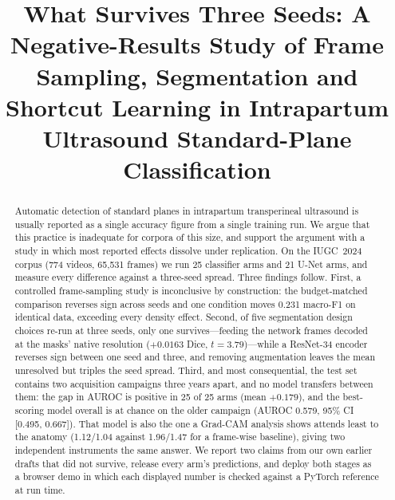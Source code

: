 \documentclass[conference]{IEEEtran}
\begin{document}
\title{What Survives Three Seeds: A Negative-Results Study of Frame Sampling,
Segmentation and Shortcut Learning in Intrapartum Ultrasound Standard-Plane
Classification}

\author{
}

\maketitle

\begin{abstract}
Automatic detection of standard planes in intrapartum transperineal ultrasound
is usually reported as a single accuracy figure from a single training run. We
argue that this practice is inadequate for corpora of this size, and support
the argument with a study in which most reported effects dissolve under
replication. On the IUGC~2024 corpus (774 videos, 65{,}531 frames) we run 25
classifier arms and 21 U-Net arms, and measure every difference against a
three-seed spread. Three findings follow. First, a controlled frame-sampling
study is inconclusive by construction: the budget-matched comparison reverses
sign across seeds and one condition moves 0.231 macro-F1 on identical data,
exceeding every density effect. Second, of five segmentation design choices
re-run at three seeds, only one survives---feeding the network frames decoded
at the masks' native resolution ($+0.0163$ Dice, $t=3.79$)---while a ResNet-34
encoder reverses sign between one seed and three, and removing augmentation
leaves the mean unresolved but triples the seed spread. Third, and most
consequential, the test set contains two acquisition campaigns three years
apart, and no model transfers between them: the gap in AUROC is positive in 25
of 25 arms (mean $+0.179$), and the best-scoring model overall is at chance on
the older campaign (AUROC 0.579, 95\% CI [0.495, 0.667]). That model is also
the one a Grad-CAM analysis shows attends least to the anatomy (1.12/1.04
against 1.96/1.47 for a frame-wise baseline), giving two independent
instruments the same answer. We report two claims from our own earlier drafts
that did not survive, release every arm's predictions, and deploy both stages
as a browser demo in which each displayed number is checked against a PyTorch
reference at run time.
\end{abstract}
\end{document}

